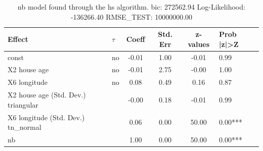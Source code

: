 \begin{table}
	\caption{nb model found through the hs algorithm. bic: 272562.94 Log-Likelihood: -136266.40 RMSE_TEST: 10000000.00}
	\begin{center}
		\begin{tabular}{|l|l|c|c|c|l|}
			\hline
			Effect & $\tau$ & Coeff & Std. Err & z-values & Prob |z|>Z \\
			\hline
			const & no & -0.01 & 1.00 & -0.01 & 0.99 \\
			\hline
			X2 house age & no & -0.01 & 2.75 & -0.00 & 1.00 \\
			\hline
			X6 longitude & no & 0.08 & 0.49 & 0.16 & 0.87 \\
			\hline
			X2 house age (Std. Dev.) triangular &  & -0.00 & 0.18 & -0.01 & 0.99 \\
			\hline
			X6 longitude (Std. Dev.) tn_normal &  & 0.06 & 0.00 & 50.00 & 0.00*** \\
			\hline
			nb &  & 1.00 & 0.00 & 50.00 & 0.00*** \\
			\hline
		\end{tabular}
	\end{center}
\end{table}